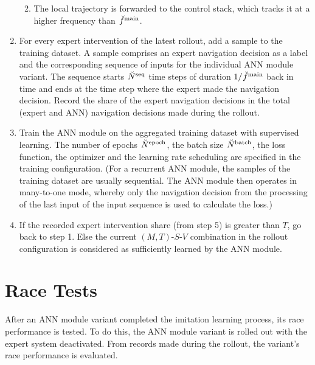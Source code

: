 \begin{enumerate}
\begin{enumerate}
\begin{enumerate}
        \end{enumerate}
        \item The local trajectory is forwarded to the control stack,
        which tracks it at a higher frequency than $\freq[\user]{\main}{}{}{}$.
    \end{enumerate}
    \item For every expert intervention of the latest rollout, 
    add a sample to the training dataset.
    A sample comprises an expert navigation decision as a label
    and the corresponding sequence of inputs
    for the individual ANN module variant.
    The sequence starts $\seqLen$ time steps 
    of duration $1/\freq[\user]{\main}{}{}{}$ 
    back in time and
    ends at the time step where
    the expert made the navigation decision.
    Record the share of the expert navigation decisions 
    in the total (expert and ANN) navigation decisions made during the rollout.
    \item Train the ANN module on the 
    aggregated training dataset with supervised learning.
    The number of epochs $\num[\user]{\text{epoch}}{}{}{}$,
    the batch size $\batchSize$,
    the loss function, the optimizer and the learning rate scheduling
    are specified in the training configuration.
    (For a recurrent ANN module, the samples of the training dataset
    are usually sequential. The ANN module then operates in many-to-one mode,
    whereby only the navigation decision from the processing of the last input 
    of the input sequence is used to calculate the loss.)
    \item If the recorded expert intervention share (from step 5) is greater
    than $T$, go back to step 1. Else the current 
    $(M,T)$-$S$-$V$ combination in the rollout configuration
    is considered as sufficiently learned by the ANN module.
\end{enumerate}

\section{Race Tests}
After an ANN module variant completed the imitation learning process,
its race performance is tested.
To do this, the ANN module variant is rolled out
with the expert system deactivated.
From records made during the rollout,
the variant's race performance is evaluated.



